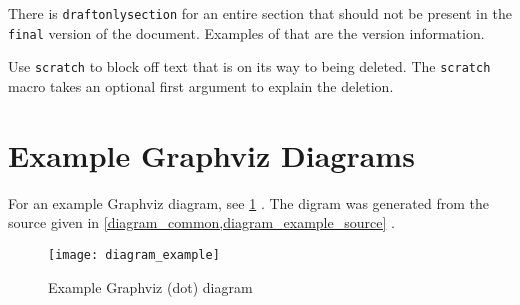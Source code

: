 There is \lstinline{draftonlysection} for an entire section that should not be present in the \lstinline{final} version of the document.
Examples of that are the version information.

Use \lstinline{scratch} to block off text that is on its way to being deleted.
The \lstinline{scratch} macro takes an optional first argument to explain the deletion.




\section{Example Graphviz Diagrams}

For an example Graphviz diagram, see
\cref{diagram_example}%
.
The digram was generated from the source given in
\cref{diagram_common,diagram_example_source}%
.

\begin{figure}[h]
    \centering
    \texttt{[image: diagram\_example]}
    \caption{Example Graphviz (dot) diagram}
    \label{diagram_example}
\end{figure}



